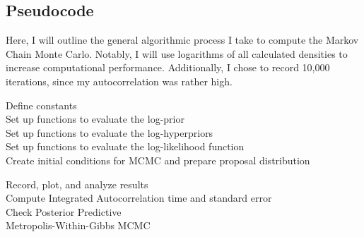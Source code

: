 \documentclass[12pt, letterpaper]{article}
\begin{document}
\newpage
\subsection{Pseudocode}
Here, I will outline the general algorithmic process I take to compute the Markov Chain Monte Carlo.
Notably, I will use logarithms of all calculated densities to increase computational performance.
Additionally, I chose to record 10,000 iterations, since my autocorrelation was rather high.

\medskip
\begin{algorithm}[H]
\SetAlgoLined
{}
 
Define constants\\
Set up functions to evaluate the log-prior\\
Set up functions to evaluate the log-hyperpriors\\
Set up functions to evaluate the log-likelihood function\\
Create initial conditions for MCMC and prepare proposal distribution\\


Record, plot, and analyze results\\
Compute Integrated Autocorrelation time and standard error\\
Check Posterior Predictive\\
\caption{Metropolis-Within-Gibbs MCMC}
\end{algorithm}
\end{document}
